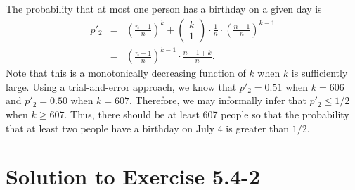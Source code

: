 \documentclass[a4paper, fleqn]{article}
\begin{document}
The probability that at most one person has a birthday on a given day is
\begin{eqnarray*}
p'_2 & = & \left(\frac{n - 1}{n}\right)^k +
\left(\!\!\begin{array}{cc}k \\ 1\end{array}\!\!\right)
\cdot \frac{1}{n} \cdot \left(\frac{n - 1}{n}\right)^{k - 1} \\
& = & \left(\frac{n - 1}{n}\right)^{k - 1} \cdot \frac{n - 1 + k}{n}.
\end{eqnarray*}
Note that this is a monotonically decreasing function of $k$ when $k$ is
sufficiently large. Using a trial-and-error approach, we know that $p'_2 = 0.51$
when $k = 606$ and $p'_2 = 0.50$ when $k = 607$. Therefore, we may informally
infer that $p'_2 \leq 1/2$ when $k \geq 607$. Thus, there should be at least 607
people so that the probability that at least two people have a birthday on July 4
is greater than $1/2$.








\section*{Solution to Exercise 5.4-2}
\end{document}
